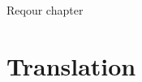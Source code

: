 \documentclass[../../main.tex]{subfiles}
\begin{document}
Reqour chapter

\section{Translation}

\end{document}
